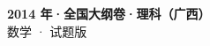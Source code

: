 \documentclass[zihao=-4, a4paper]{ctexart}
\begin{document}
\begin{center}
  {\Large\bfseries 2014 年·全国大纲卷·理科（广西）}\\[4pt]
  {\large 数学 · 试题版}
\end{center}
\medskip
{}

\end{document}
